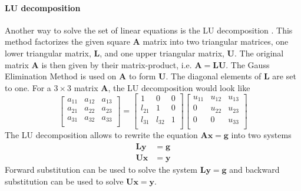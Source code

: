 \documentclass[%
oneside,                 %
final,                   %
10pt]{article}
\begin{document}
\paragraph{LU decomposition}
Another way to solve the set of linear equations is the LU decomposition  \cite{LUdecomp}.
This method factorizes the given square $\mathbf{A}$ matrix into two triangular matrices, one lower triangular matrix, $ \mathbf{L}$, and one upper triangular matrix, $\mathbf{U}$.
The original matrix $\mathbf{A}$ is then given by their matrix-product, i.e. $ \mathbf{A}= \mathbf{L} \mathbf{U}$.
The Gauss Elimination Method is used on $\mathbf{A}$ to form $\mathbf{U}$.
The diagonal elements of $\mathbf{L}$ are set to one. For a $3 \times 3$ matrix $\mathbf{A}$, the LU decomposition would look like
\[
     \begin{bmatrix}
                           a_{11}	& a_{12} & a_{13} \\
                           a_{21} & a_{22} & a_{23}  \\
                           a_{31} & a_{32} & a_{33}  \\
                      \end{bmatrix}
  =\begin{bmatrix}
                           1		& 0 & 0 \\
                           l_{21} & 1 & 0  \\
                           l_{31} & l_{32} & 1  \\
                      \end{bmatrix}
   \begin{bmatrix}
                           u_{11}& u_{12} & u_{13} \\
                           0 		& u_{22} & u_{23}  \\
                           0 		& 0 & u_{33}  \\
                      \end{bmatrix}
\]
The LU decomposition allows to rewrite the equation $\mathbf{Ax} = \mathbf{g}$ into two systems
\begin{equation}
\begin{aligned}
\mathbf{Ly} &= \mathbf{g} \\
\mathbf{Ux} &= \mathbf{y}
\end{aligned}
\end{equation}
Forward substitution can be used to solve the system $\mathbf{Ly} = \mathbf{g}$ and backward substitution can be used to solve $\mathbf{Ux} = \mathbf{y}$. \\
\end{document}
